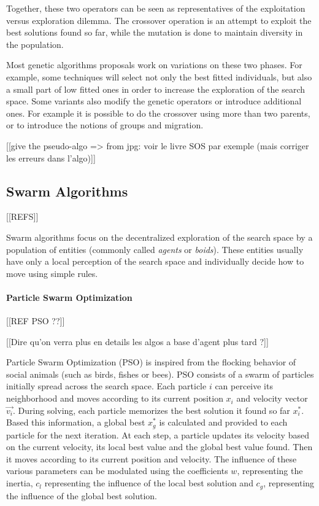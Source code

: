 Together, these two operators can be seen as representatives of the exploitation versus exploration dilemma. The crossover operation is an attempt to exploit the best solutions found so far, while the mutation is done to maintain diversity in the population. 

Most genetic algorithms proposals work on variations on these two phases. For example, some techniques will select not only the best fitted individuals, but also a small part of low fitted ones in order to increase the exploration of the search space. Some variants also modify the genetic operators or introduce additional ones. For example it is possible to do the crossover using more than two parents, or to introduce the notions of groups and migration.

[[give the pseudo-algo => from jpg: voir le livre SOS par exemple (mais corriger les erreurs dans l'algo)]]

\subsection{Swarm Algorithms}

[[REFS]]

Swarm algorithms focus on the decentralized exploration of the search space by a population of entities (commonly called \emph{agents} or \emph{boids}). These entities usually have only a local perception of the search space and individually decide how to move using simple rules.

\paragraph*{Particle Swarm Optimization}

[[REF PSO ??]]

[[Dire qu'on verra plus en details les algos a base d'agent plus tard ?]]

Particle Swarm Optimization (PSO) is inspired from the flocking behavior of social animals (such as birds, fishes or bees). PSO consists of a swarm of particles initially spread across the search space. Each particle $i$ can perceive its neighborhood and moves according to its current position $x_i$ and velocity vector $\overrightarrow{v_i}$.
During solving, each particle memorizes the best solution it found so far $x_i^*$. Based this information, a global best $x_g^*$ is calculated and provided to each particle for the next iteration.
At each step, a particle updates its velocity based on the current velocity, its local best value and the global best value found. Then it moves according to its current position and velocity. The influence of these various parameters can be modulated using the coefficients $w$, representing the inertia, $c_l$ representing the influence of the local best solution and $c_g$, representing the influence of the global best solution.

